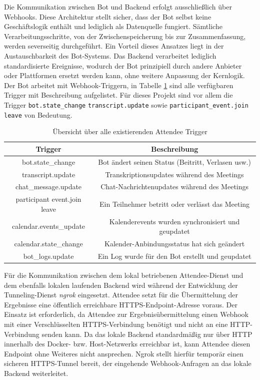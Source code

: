 Die Kommunikation zwischen Bot und Backend erfolgt ausschließlich über Webhooks. Diese Architektur stellt sicher, dass der Bot selbst keine Geschäftslogik enthält und lediglich als Datenquelle fungiert. Sämtliche Verarbeitungsschritte, von der Zwischenspeicherung bis zur Zusammenfassung, werden severseitig durchgeführt. Ein Vorteil dieses Ansatzes liegt in der Austauschbarkeit des Bot-Systems. Das Backend verarbeitet lediglich standardisierte Ereignisse, wodurch der Bot prinzipiell durch andere Anbieter oder Plattformen ersetzt werden kann, ohne weitere Anpassung der Kernlogik.
Der Bot arbeitet mit Webhook-Triggern, in Tabelle \ref{tab:attendee_trigger} sind alle verfügbaren Trigger mit Beschreibung aufgelistet. Für dieses Projekt sind vor allem die Trigger \texttt{bot.state\_change} \texttt{transcript.update} sowie \texttt{participant\_event.join leave} von Bedeutung. 

\begin{table}[H]
    \centering
    \begin{tabular}{|c|c|}
        \hline
         \textbf{Trigger}&  \textbf{Beschreibung}\\
         \hline
         bot.state\_change & Bot ändert seinen Status (Beitritt, Verlasen usw.)\\
         \hline
         transcript.update & Transkriptionsupdates während des Meetings\\
         \hline
         chat\_message.update & Chat-Nachrichtenupdates während des Meetings\\
         \hline
         participant event.join leave & Ein Teilnehmer betritt oder verlässt das Meeting\\
         \hline
         calendar.events\_update & Kalenderevents wurden synchronisiert und geupdatet\\
         \hline
         calendar.state\_change & Kalender-Anbindungsstatus hat sich geändert\\
         \hline 
         bot\_logs.update & Ein Log wurde für den Bot erstellt und geupdatet\\
         \hline
    \end{tabular}
    \caption{Übersicht über alle existierenden Attendee Trigger}
    \label{tab:attendee_trigger}
\end{table}

\newpage
Für die Kommunikation zwischen dem lokal betriebenen Attendee-Dienst und dem ebenfalls lokalen laufenden Backend wird während der Entwicklung der Tunneling-Dienst \textit{ngrok} eingesetzt. Attendee setzt für die Übermittelung der Ergebnisse eine öffentlich erreichbare HTTPS-Endpoint-Adresse voraus. 
Der Einsatz ist erforderlich, da Attendee zur Ergebnisübermittelung einen Webhook mit einer Verschlüsselten HTTPS-Verbindung benötigt und nicht an eine HTTP-Verbindung senden kann. Da das lokale Backend standardmäßig nur über HTTP innerhalb des Docker- bzw. Host-Netzwerks erreichbar ist, kann Attendee diesen Endpoint ohne Weiteres nicht ansprechen. Ngrok stellt hierfür temporär einen sicheren HTTPS-Tunnel bereit, der eingehende Webhook-Anfragen an das lokale Backend weiterleitet.

